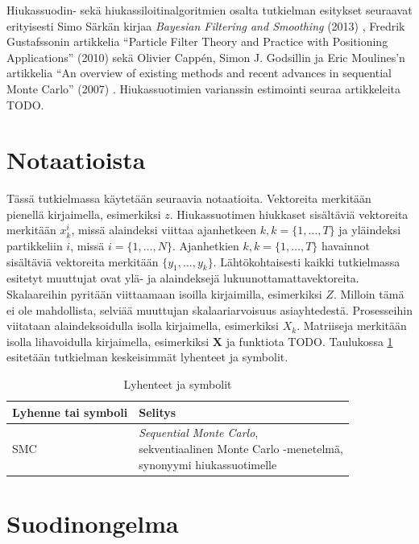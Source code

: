 \documentclass[
  12pt,
  a4paper, twoside]{book}
\begin{document}
Hiukassuodin- sekä hiukassiloitinalgoritmien osalta tutkielman esitykset seuraavat erityisesti Simo Särkän kirjaa \textit{Bayesian Filtering and Smoothing} (2013) \citep{sarkka-2013}, Fredrik Gustafssonin artikkelia ``Particle Filter Theory and Practice with Positioning Applications'' (2010) \citep{gustafsson-2010} sekä Olivier Cappén, Simon J. Godsillin ja Eric Moulines'n artikkelia ``An overview of existing methods and recent advances in sequential Monte Carlo'' (2007) \citep{cappe-2007}. Hiukassuotimien varianssin estimointi seuraa artikkeleita TODO.

\section{Notaatioista}

Tässä tutkielmassa käytetään seuraavia notaatioita. Vektoreita merkitään pienellä kirjaimella, esimerkiksi \(z\). Hiukassuotimen hiukkaset sisältäviä vektoreita merkitään \(x_k^i\), missä alaindeksi viittaa ajanhetkeen \(k, k=\{1,\ldots,T\}\) ja yläindeksi partikkeliin \(i\), missä \(i=\{1,\ldots,N\}\). Ajanhetkien \(k, k=\{1,\ldots,T\}\) havainnot sisältäviä vektoreita merkitään \(\{y_1,\ldots,y_k\}\). Lähtökohtaisesti kaikki tutkielmassa esitetyt muuttujat ovat ylä- ja alaindeksejä lukuunottamattavektoreita. Skalaareihin pyritään viittaamaan isoilla kirjaimilla, esimerkiksi \(Z\). Milloin tämä ei ole mahdollista, selviää muuttujan skalaariarvoisuus asiayhtedestä. Prosesseihin viitataan alaindeksoidulla isolla kirjaimella, esimerkiksi \(X_k\). Matriiseja merkitään isolla lihavoidulla kirjaimella, esimerkiksi \(\mathbf{X}\) ja funktiota TODO. Taulukossa \ref{tab:lyhenteet-ja-symbolit} esitetään tutkielman keskeisimmät lyhenteet ja symbolit.

\begin{table}

\caption{\label{tab:lyhenteet-ja-symbolit}Lyhenteet ja symbolit}
\centering
\begin{tabular}[t]{ll}
\toprule
Lyhenne tai symboli & Selitys\\
\midrule
SMC & \makecell[l]{\textit{Sequential Monte Carlo}, \\sekventiaalinen Monte Carlo -menetelmä, \\synonyymi hiukassuotimelle}\\
\bottomrule
\end{tabular}
\end{table}

\section{Suodinongelma}
\end{document}
